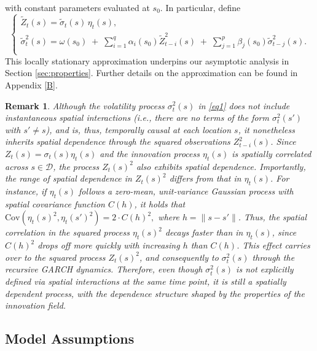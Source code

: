 \documentclass[fleqn,11pt]{article}
\newtheorem{remark}{Remark}
\begin{document}
with constant parameters evaluated at $s_0$.  In particular, define
\begin{equation*}
\begin{cases}
\widetilde{Z}_{t}(s)=\widetilde{\sigma}_{t}(s)\,\eta_{t}(s), \\
\widetilde{\sigma}_{t}^2(s)
= \omega(s_{0})\;+\;\sum_{i=1}^q\alpha_i(s_{0})\widetilde{Z}_{t-i}^2(s)\;+\;\sum_{j=1}^p\beta_j(s_{0})\widetilde{\sigma}_{t-j}^2(s). \\
\end{cases}
\end{equation*}
This locally stationary approximation underpins our asymptotic analysis in Section \ref{sec:properties}. Further details on the approximation can be found in Appendix \ref{B}.

\begin{remark}\label{rmk:1}
Although the volatility process $\sigma_t^2(s)$ in \eqref{eq1} does not include instantaneous spatial interactions (i.e., there are no terms of the form $\sigma_t^2(s')$ with $s' \neq s$), and is, thus, temporally causal at each location $s$, it nonetheless inherits spatial dependence through the squared observations $Z_{t-i}^2(s)$. Since $Z_t(s) = \sigma_t(s)\eta_t(s)$ and the innovation process $\eta_t(s)$ is spatially correlated across $s \in \mathcal{D}$, the process $Z_t(s)^2$ also exhibits spatial dependence. Importantly, the range of spatial dependence in $Z_t(s)^2$ differs from that in $\eta_t(s)$. For instance, if $\eta_t(s)$ follows a zero-mean, unit-variance Gaussian process with spatial covariance function $C(h)$, it holds that $\mathrm{Cov}(\eta_t(s)^2, \eta_t(s')^2) = 2 \cdot C(h)^2,$
where $h = \|s - s'\|$. Thus, the spatial correlation in the squared process $\eta_t(s)^2$ decays faster than in $\eta_t(s)$, since $C(h)^2$ drops off more quickly with increasing $h$ than $C(h)$. This effect carries over to the squared process $Z_t(s)^2$, and consequently to $\sigma_t^2(s)$ through the recursive GARCH dynamics. Therefore, even though $\sigma_t^2(s)$ is not explicitly defined via spatial interactions at the same time point, it is still a spatially dependent process, with the dependence structure shaped by the properties of the innovation field.
\end{remark}

\subsection{Model Assumptions}\label{assumptions}
\end{document}
